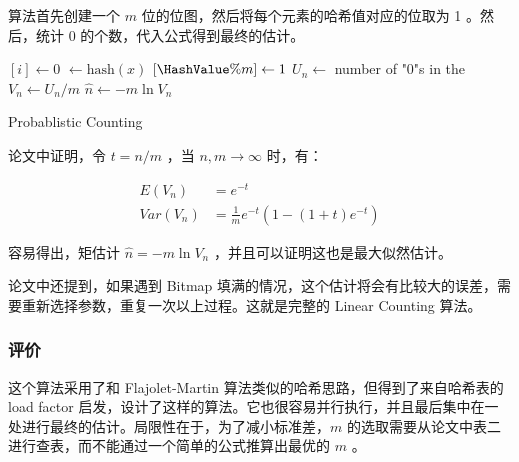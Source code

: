 \documentclass{ctexart}
\begin{document}
    算法首先创建一个 $m$ 位的位图，然后将每个元素的哈希值对应的位取为 1 。然后，统计 0 的个数，代入公式得到最终的估计。

    \begin{algorithm}
        \BlankLine
         {
            \Bitmap $[i] \leftarrow 0$\;
        }
         {
            \HashValue$ \leftarrow \mathrm{hash}(x)$\;
            \Bitmap$[\HashValue \% m] \leftarrow 1$\;
        }
        $U_n \leftarrow $ number of "0"s in the \Bitmap \;
        $V_n \leftarrow U_n/m$ \;
        $\hat{n} \leftarrow -m\ln{V_n}$ \;
        \caption{Probablistic Counting}
    \end{algorithm}

    论文中证明，令 $t = n / m$ ，当 $n, m \to \infty$ 时，有：

    \begin{align*}
        E(V_n) &= e^{-t} \\
        Var(V_n) &= \frac1me^{-t}(1-(1+t)e^{-t})
    \end{align*}

    容易得出，矩估计 $\hat{n} = -m\ln{V_n}$ ，并且可以证明这也是最大似然估计。

    论文中还提到，如果遇到 Bitmap 填满的情况，这个估计将会有比较大的误差，需要重新选择参数，重复一次以上过程。这就是完整的 Linear Counting 算法。

\subsubsection{评价}
    这个算法采用了和 Flajolet-Martin 算法类似的哈希思路，但得到了来自哈希表的 load factor 启发，设计了这样的算法。它也很容易并行执行，并且最后集中在一处进行最终的估计。局限性在于，为了减小标准差，$m$ 的选取需要从论文中表二进行查表，而不能通过一个简单的公式推算出最优的 $m$ 。

\printbibliography[title=引用文献]
\end{document}
